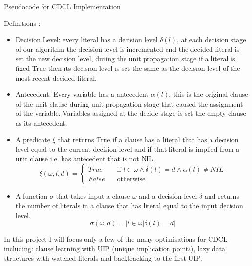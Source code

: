 \documentclass[12pt,a4paper]{article}
\begin{document}
\begin{center}Pseudocode for CDCL Implementation \cite[p. 136]{CDCL} \end{center}
Definitions \cite[p.132]{CDCL}:\\
\begin{itemize}
\item{
Decision Level: every literal has a decision level $\delta(l)$, at each decision stage of our algorithm the decision level is incremented and the decided literal is set the new decision level, during the unit propagation stage if a literal is fixed True then its decision level is set the same as the decision level of the most recent decided literal.}
\item{
Antecedent: Every variable has a antecedent $\alpha(l)$, this is the original clause of the unit clause during unit propagation stage that caused the assignment of the variable. Variables assigned at the decide stage is set the empty clause as its antecedent.}
\item{
A predicate $\xi$ that returns True if a clause has a literal that has a decision level equal to the current decision level and if that literal is implied from a unit clause i.e. has antecedent that is not NIL.
\[ \xi(\omega, l, d) =
  \begin{cases}
    True & \quad \text{if } l \in \omega \land \delta(l) = d \land \alpha(l) \neq  NIL\\
    False & \quad \text{otherwise }
  \end{cases}
\]

}
\item{
A function $\sigma$ that takes input a clause $\omega$ and a decision level $\delta$ and returns the number of literals in a clause that has literal equal to the input decision level.
\[\sigma(\omega, d) = |{l \in \omega | \delta(l) = d }| 
\]
}
\end{itemize}
In this project I will focus only a few of the many optimisations for CDCL including: clause learning with UIP (unique implication points), lazy data structures with watched literals and backtracking to the first UIP.
\end{document}
